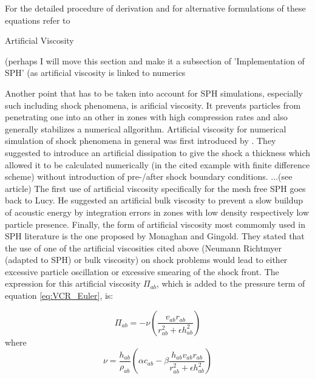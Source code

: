 \documentclass{report}
\begin{document}
For the detailed procedure of derivation and for alternative formulations of
these equations refer to \cite{Monaghan2005, Liu2003}

Artificial Viscosity

(perhaps I will move this section and make it a subsection of 'Implementation of SPH' (as artificial viscosity is linked to numerics

Another point that has to be taken into account for SPH simulations, especially
such including shock phenomena, is arificial viscosity\cite{Monaghan2005}. It
prevents particles from penetrating one into an other in zones with high
compression rates and also generally stabilizes a numerical
allgorithm.
Artificial viscosity for numerical simulation of shock phenomena
in general was first introduced by \cite{vonNeumann1950}. They suggested to
introduce an artificial dissipation to give the shock a thickness which
allowed it to be calculated numerically (in the cited example with finite difference
scheme) without introduction of pre-/after shock boundary conditions.    ...(see article)
The first use of artificial viscosity specifically for the mesh free SPH goes
back to Lucy\cite{Lucy1977}. He suggested an artificial bulk viscosity to
prevent a slow buildup of acoustic energy by integration errors in zones with
low density respectively low particle presence. 
Finally, the form of artificial viscosity most commomly used in SPH
literature\cite{Liu2003} is the one proposed by Monaghan and
Gingold\cite{Monaghan1983}. They stated that the use of one of the artificial
viscosities cited above (Neumann Richtmyer (adapted to SPH) or bulk
viscosity) on shock problems would lead to either excessive particle
oscillation or excessive smearing of the shock front. The expression for this
artificial viscosity $\Pi_{ab}$, which is added to the pressure term of
equation \ref{eq:VCR_Euler}, is:

\begin{equation}
\label{eq:MonArtVis}
\Pi _{\mathit{ab}}=-\nu
\left(\frac{v_{\mathit{ab}}r_{\mathit{ab}}}{r_{\mathit{ab}}^{2}+\epsilon
h_{\mathit{ab}}^{2}}\right)
\end{equation}
where 
\begin{equation}
\label{eq:FactArtVis}
\nu =\frac{h_{\mathit{ab}}}{\rho _{\mathit{ab}}}\left(\alpha
c_{\mathit{ab}}-\beta
\frac{h_{\mathit{ab}}v_{\mathit{ab}}r_{\mathit{ab}}}{r_{\mathit{ab}}^{2}+\epsilon
h_{\mathit{ab}}^{2}}\right)
\end{equation}
\end{document}
